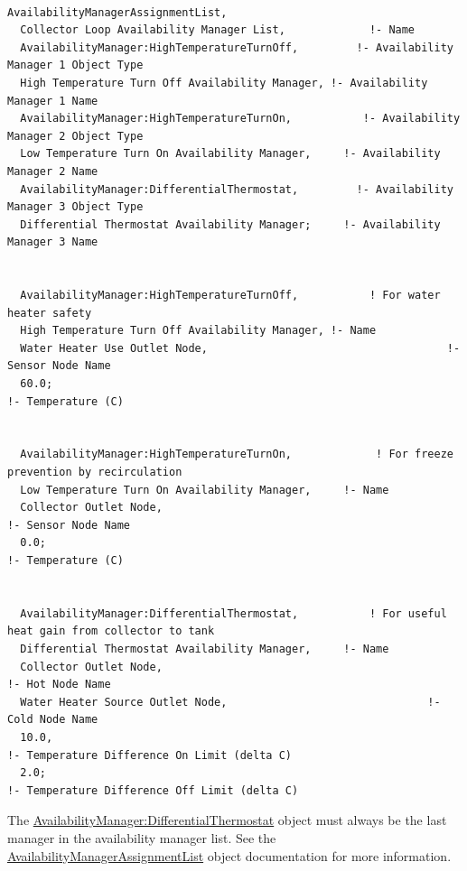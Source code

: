 \begin{lstlisting}

AvailabilityManagerAssignmentList,
  Collector Loop Availability Manager List,             !- Name
  AvailabilityManager:HighTemperatureTurnOff,         !- Availability Manager 1 Object Type
  High Temperature Turn Off Availability Manager, !- Availability Manager 1 Name
  AvailabilityManager:HighTemperatureTurnOn,           !- Availability Manager 2 Object Type
  Low Temperature Turn On Availability Manager,     !- Availability Manager 2 Name
  AvailabilityManager:DifferentialThermostat,         !- Availability Manager 3 Object Type
  Differential Thermostat Availability Manager;     !- Availability Manager 3 Name


  AvailabilityManager:HighTemperatureTurnOff,           ! For water heater safety
  High Temperature Turn Off Availability Manager, !- Name
  Water Heater Use Outlet Node,                                     !- Sensor Node Name
  60.0;                                                                                     !- Temperature (C)


  AvailabilityManager:HighTemperatureTurnOn,             ! For freeze prevention by recirculation
  Low Temperature Turn On Availability Manager,     !- Name
  Collector Outlet Node,                                                   !- Sensor Node Name
  0.0;                                                                                       !- Temperature (C)


  AvailabilityManager:DifferentialThermostat,           ! For useful heat gain from collector to tank
  Differential Thermostat Availability Manager,     !- Name
  Collector Outlet Node,                                                   !- Hot Node Name
  Water Heater Source Outlet Node,                               !- Cold Node Name
  10.0,                                                                                     !- Temperature Difference On Limit (delta C)
  2.0;                                                                                       !- Temperature Difference Off Limit (delta C)
\end{lstlisting}

The \hyperref[availabilitymanagerdifferentialthermostat]{AvailabilityManager:DifferentialThermostat} object must always be the last manager in the availability manager list. See the \hyperref[availabilitymanagerassignmentlist]{AvailabilityManagerAssignmentList} object documentation for more information.

